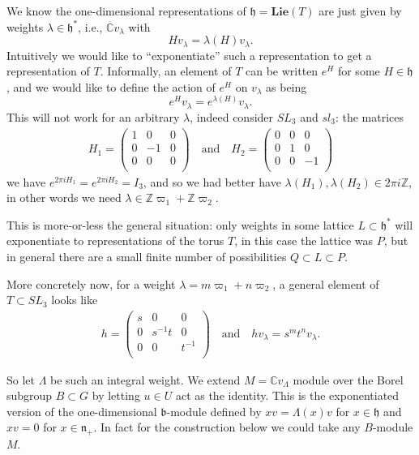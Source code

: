 \documentclass[12pt]{article}
\theoremstyle{plain}
\theoremstyle{definition}
\numberwithin{equation}{section}
\newcommand{\la}{\lambda}
\newcommand{\La}{\Lambda}
\newcommand{\C}{\mathbb{C}}
\newcommand{\Z}{\mathbb{Z}}
\newcommand{\frakb}{\mathfrak{b}}
\newcommand{\h}{\mathfrak{h}}
\newcommand{\n}{\mathfrak{n}}
\newcommand{\Lie}{\mathbf{Lie}}
\begin{document}
We know the one-dimensional representations of $\h = \Lie(T)$ are just given by weights $\la \in \h^*$, i.e., $\C v_\la$ with
\[
H v_\la = \la(H) v_\la.
\]
Intuitively we would like to ``exponentiate'' such a representation to get a representation of $T$. Informally, an element of $T$ can be written $e^H$ for some $H \in \h$, and we would like to define the action of $e^H$ on $v_\la$ as being
\[
e^{H} v_\la = e^{\la(H)} v_\la.
\]
This will not work for an arbitrary $\la$, indeed consider $SL_3$ and $sl_3$: the matrices
\begin{align*}
H_1 = \left(
\begin{array}{ccc}
1 & 0 & 0 \\
0 & -1 & 0 \\
0 & 0 & 0 \\
\end{array}
\right)
%
\quad \text{and} \quad
H_2 = \left(
\begin{array}{ccc}
0 & 0 & 0 \\
0 & 1 & 0 \\
0 & 0 & -1 \\
\end{array}
\right)
\end{align*}
we have $e^{2\pi i H_1} = e^{2\pi i H_2} = I_3$, and so we had better have $\la(H_1), \la(H_2) \in 2\pi i \Z$, in other words we need $\la \in \Z \varpi_1 + \Z \varpi_2$.

This is more-or-less the general situation: only weights in some lattice $L \subset \h^*$ will exponentiate to representations of the torus $T$, in this case the lattice was $P$, but in general there are a small finite number of possibilities $Q \subset L \subset P$.

More concretely now, for a weight $\la = m \varpi_1 + n \varpi_2$, a general element of $T \subset SL_3$ looks like
\begin{align*}
h = \left(
\begin{array}{ccc}
s & 0 & 0 \\
0 & s^{-1} t & 0 \\
0 & 0 & t^{-1} \\
\end{array}
\right)
%
\quad \text{and} \quad
h v_\la = s^m t^n v_\la.
\end{align*}

So let $\La$ be such an integral weight. We extend $M = \C v_\La$ module over the Borel subgroup $B \subset G$ by letting $u \in U$ act as the identity. This is the exponentiated version of the one-dimensional $\frakb$-module defined by $x v = \Lambda(x) v$ for $x \in \h$ and $xv = 0$ for $x \in \n_+$. In fact for the construction below we could take any $B$-module $M$.
\end{document}
